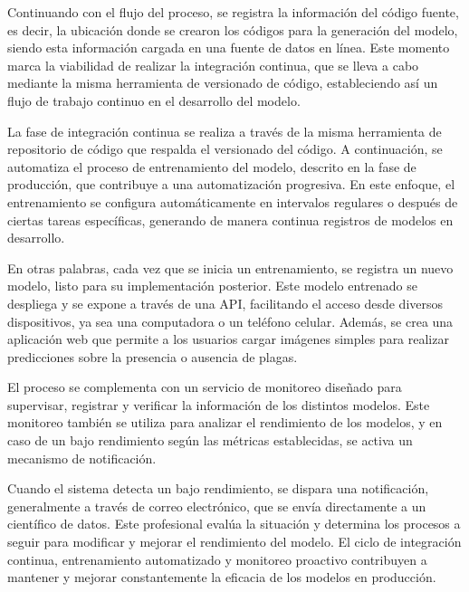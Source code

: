 Continuando con el flujo del proceso, se registra la información del código fuente, es decir, la ubicación donde se crearon los códigos para la generación del modelo, siendo esta información cargada en una fuente de datos en línea. Este momento marca la viabilidad de realizar la integración continua, que se lleva a cabo mediante la misma herramienta de versionado de código, estableciendo así un flujo de trabajo continuo en el desarrollo del modelo. \newline

La fase de integración continua se realiza a través de la misma herramienta de repositorio de código que respalda el versionado del código. A continuación, se automatiza el proceso de entrenamiento del modelo, descrito en la fase de producción, que contribuye a una automatización progresiva. En este enfoque, el entrenamiento se configura automáticamente en intervalos regulares o después de ciertas tareas específicas, generando de manera continua registros de modelos en desarrollo. \newline

En otras palabras, cada vez que se inicia un entrenamiento, se registra un nuevo modelo, listo para su implementación posterior. Este modelo entrenado se despliega y se expone a través de una API, facilitando el acceso desde diversos dispositivos, ya sea una computadora o un teléfono celular. Además, se crea una aplicación web que permite a los usuarios cargar imágenes simples para realizar predicciones sobre la presencia o ausencia de plagas. \newline

El proceso se complementa con un servicio de monitoreo diseñado para supervisar, registrar y verificar la información de los distintos modelos. Este monitoreo también se utiliza para analizar el rendimiento de los modelos, y en caso de un bajo rendimiento según las métricas establecidas, se activa un mecanismo de notificación. \newline

\newpage

Cuando el sistema detecta un bajo rendimiento, se dispara una notificación, generalmente a través de correo electrónico, que se envía directamente a un científico de datos. Este profesional evalúa la situación y determina los procesos a seguir para modificar y mejorar el rendimiento del modelo. El ciclo de integración continua, entrenamiento automatizado y monitoreo proactivo contribuyen a mantener y mejorar constantemente la eficacia de los modelos en producción. \newline

